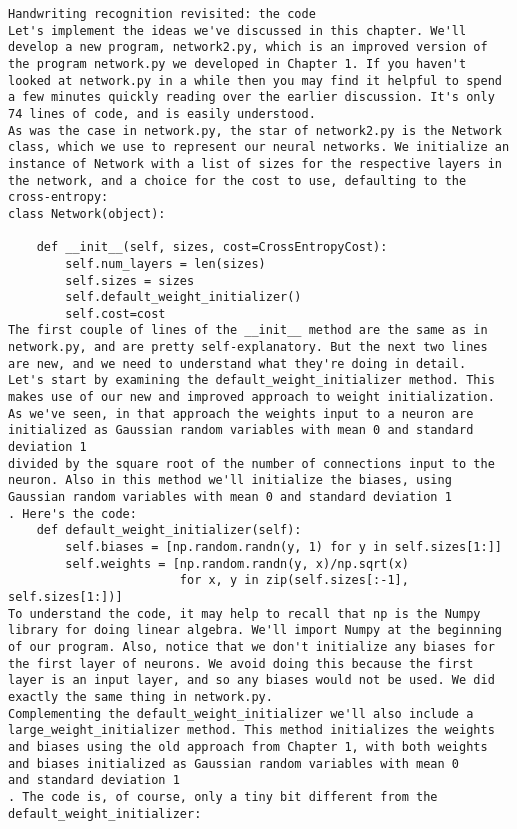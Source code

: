 \begin{lstlisting}
Handwriting recognition revisited: the code
Let's implement the ideas we've discussed in this chapter. We'll develop a new program, network2.py, which is an improved version of the program network.py we developed in Chapter 1. If you haven't looked at network.py in a while then you may find it helpful to spend a few minutes quickly reading over the earlier discussion. It's only 74 lines of code, and is easily understood. 
As was the case in network.py, the star of network2.py is the Network class, which we use to represent our neural networks. We initialize an instance of Network with a list of sizes for the respective layers in the network, and a choice for the cost to use, defaulting to the cross-entropy:
class Network(object):

    def __init__(self, sizes, cost=CrossEntropyCost):
        self.num_layers = len(sizes)
        self.sizes = sizes
        self.default_weight_initializer()
        self.cost=cost
The first couple of lines of the __init__ method are the same as in network.py, and are pretty self-explanatory. But the next two lines are new, and we need to understand what they're doing in detail.
Let's start by examining the default_weight_initializer method. This makes use of our new and improved approach to weight initialization. As we've seen, in that approach the weights input to a neuron are initialized as Gaussian random variables with mean 0 and standard deviation 1
divided by the square root of the number of connections input to the neuron. Also in this method we'll initialize the biases, using Gaussian random variables with mean 0 and standard deviation 1
. Here's the code:
    def default_weight_initializer(self):
        self.biases = [np.random.randn(y, 1) for y in self.sizes[1:]]
        self.weights = [np.random.randn(y, x)/np.sqrt(x) 
                        for x, y in zip(self.sizes[:-1], self.sizes[1:])]
To understand the code, it may help to recall that np is the Numpy library for doing linear algebra. We'll import Numpy at the beginning of our program. Also, notice that we don't initialize any biases for the first layer of neurons. We avoid doing this because the first layer is an input layer, and so any biases would not be used. We did exactly the same thing in network.py.
Complementing the default_weight_initializer we'll also include a large_weight_initializer method. This method initializes the weights and biases using the old approach from Chapter 1, with both weights and biases initialized as Gaussian random variables with mean 0
and standard deviation 1
. The code is, of course, only a tiny bit different from the default_weight_initializer:

\end{lstlisting}
